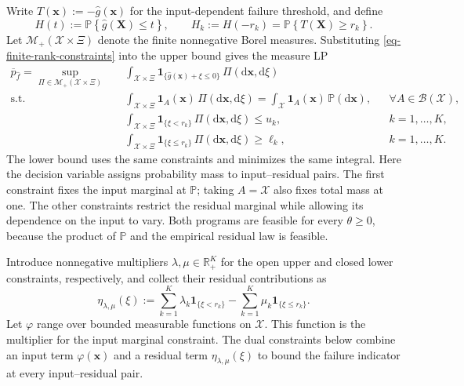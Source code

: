 Write $T(\bm x):=-\hat g(\bm x)$ for the input-dependent failure threshold, and define
\begin{equation}
  H(t):=\mathbb P\left\{\hat g(\bm X)\le t\right\},\qquad
  H_k:=H(-r_k)=\mathbb P\left\{T(\bm X)\ge r_k\right\}.
  \label{eq-surrogate-response-cdf}
\end{equation}
Let $\mathcal M_+(\mathcal X\times\Xi)$ denote the finite nonnegative Borel measures. Substituting \eqref{eq-finite-rank-constraints} into the upper bound gives the measure LP
\begin{equation}
  \begin{aligned}
    \overline p_{\hat f}
    =\sup_{\Pi\in\mathcal M_+(\mathcal X\times\Xi)}\quad&
    \int_{\mathcal X\times\Xi}\mathbf1_{\{\hat g(\bm x)+\xi\le0\}}\,\Pi\left(\mathrm d\bm x,\mathrm d\xi\right)\\
    \text{s.t.}\quad&
    \int_{\mathcal X\times\Xi}\mathbf1_A(\bm x)\,\Pi\left(\mathrm d\bm x,\mathrm d\xi\right)
    =\int_{\mathcal X}\mathbf1_A(\bm x)\,\mathbb P\left(\mathrm d\bm x\right),
    &&\forall A\in\mathcal B(\mathcal X),\\
    &\int_{\mathcal X\times\Xi}\mathbf1_{\{\xi<r_k\}}\,\Pi\left(\mathrm d\bm x,\mathrm d\xi\right)\le u_k,
    &&k=1,\ldots,K,\\
    &\int_{\mathcal X\times\Xi}\mathbf1_{\{\xi\le r_k\}}\,\Pi\left(\mathrm d\bm x,\mathrm d\xi\right)\ge\ell_k,
    &&k=1,\ldots,K.
  \end{aligned}
  \label{eq-measure-upper}
\end{equation}
The lower bound uses the same constraints and minimizes the same integral. Here the decision variable assigns probability mass to input--residual pairs. The first constraint fixes the input marginal at $\mathbb P$; taking $A=\mathcal X$ also fixes total mass at one. The other constraints restrict the residual marginal while allowing its dependence on the input to vary. Both programs are feasible for every $\theta\ge0$, because the product of $\mathbb P$ and the empirical residual law is feasible.

Introduce nonnegative multipliers $\lambda,\mu\in\mathbb R_+^K$ for the open upper and closed lower constraints, respectively, and collect their residual contributions as
\begin{equation}
  \eta_{\lambda,\mu}(\xi):=
  \sum_{k=1}^K\lambda_k\mathbf1_{\{\xi<r_k\}}
  -\sum_{k=1}^K\mu_k\mathbf1_{\{\xi\le r_k\}}.
  \label{eq-dual-step-function}
\end{equation}
Let $\varphi$ range over bounded measurable functions on $\mathcal X$. This function is the multiplier for the input marginal constraint. The dual constraints below combine an input term $\varphi(\bm x)$ and a residual term $\eta_{\lambda,\mu}(\xi)$ to bound the failure indicator at every input--residual pair.

